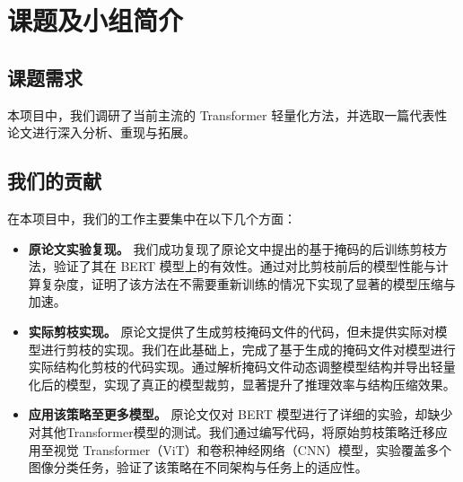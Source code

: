 \documentclass[UTF8,openany]{ctexbook}
\begin{document}
\setcounter{page}{1}

\newpage


\renewcommand{\contentsname}{\centerline{\zihao{-3}\heiti 目\quad 录}}
\tableofcontents
\thispagestyle{empty}
\newpage

\setcounter{page}{1}


\chapter{课题及小组简介}
\section{课题需求}

本项目中，我们调研了当前主流的 Transformer\cite{vaswani2017attention} 轻量化方法，并选取一篇代表性论文进行深入分析、重现与拓展。

\section{我们的贡献}

在本项目中，我们的工作主要集中在以下几个方面：

\begin{itemize}[noitemsep=0pt, topsep=0pt, parsep=0pt, partopsep=0pt]
    \item \textbf{原论文实验复现。} 我们成功复现了原论文中提出的基于掩码的后训练剪枝方法，验证了其在 BERT \cite{devlin2019bert} 模型上的有效性。通过对比剪枝前后的模型性能与计算复杂度，证明了该方法在不需要重新训练的情况下实现了显著的模型压缩与加速。
    
    \item \textbf{实际剪枝实现。} 原论文提供了生成剪枝掩码文件的代码，但未提供实际对模型进行剪枝的实现。我们在此基础上，完成了基于生成的掩码文件对模型进行实际结构化剪枝的代码实现。通过解析掩码文件动态调整模型结构并导出轻量化后的模型，实现了真正的模型裁剪，显著提升了推理效率与结构压缩效果。
    
    \item \textbf{应用该策略至更多模型。} 原论文仅对 BERT 模型进行了详细的实验，却缺少对其他Transformer模型的测试。我们通过编写代码，将原始剪枝策略迁移应用至视觉 Transformer（ViT）和卷积神经网络（CNN）模型，实验覆盖多个图像分类任务，验证了该策略在不同架构与任务上的适应性。
\end{itemize}
\end{document}
